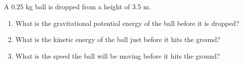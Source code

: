 \documentclass[12pt]{examdesign}
\begin{document}
\begin{shortanswer}[title={Free Response}, rearrange=no]
	\begin{question}
A 0.25 kg ball is dropped from a height of 3.5 m.  
	\begin{enumerate}
		\item {What is the gravitational potential energy of the ball before it is dropped?}
		\vspace{1 in}
		\item {What is the kinetic energy of the ball just before it hits the ground?}
				\vspace{1 in}
		\item{What is the speed the ball will be moving before it hits the ground?}
	\end{enumerate}
	\end{question}
	
\end{shortanswer}
\end{document}
